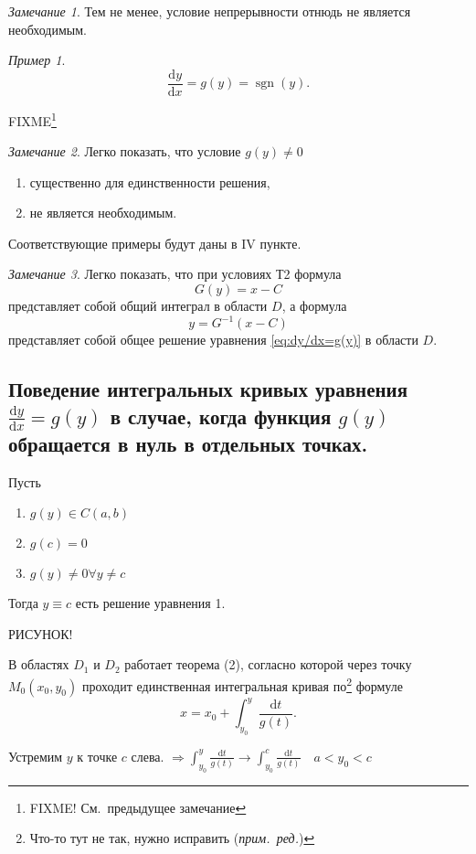 \documentclass[a4paper,10pt]{report}
\newcommand{\ud}{\mathrm{d}}
\newcommand{\ednote}{(\textit{прим.\ ред.})}
\theoremstyle{definition}
\theoremstyle{remark}
\newtheorem{note}{Замечание}[section]
\newtheorem{example}{Пример}[section]
\theoremstyle{plain}
\DeclareMathOperator{\sgn}{sgn}
\begin{document}
\begin{note}
 Тем не менее, условие непрерывности отнюдь не является необходимым.
\end{note}
\begin{example}
 \begin{equation*}
  \frac{\ud y}{\ud x} = g(y) = \sgn(y).
 \end{equation*}

 FIXME\footnote{FIXME! См.\ предыдущее замечание}
\end{example}
\begin{note}
 Легко показать, что условие $g(y) \ne 0$
 \begin{enumerate}
  \renewcommand{\theenumi}{\asbuk{enumi}}
  \item существенно для единственности решения,
  \item не является необходимым.
 \end{enumerate}
 Соответствующие примеры будут даны в IV пункте.
\end{note}
\begin{note}
 Легко показать, что при условиях Т2 формула
 \[
  G(y) = x-C
 \]
 представляет собой общий интеграл в области $D$, а формула
 \[
  y = G^{-1}(x-C)
 \]
 представляет собой общее решение уравнения \eqref{eq:dy/dx=g(y)} в области $D$.
\end{note}

\subsection{Поведение интегральных кривых уравнения $\displaystyle\frac{\ud y}{\ud x} = g(y)$ в случае, когда функция $g(y)$ обращается в нуль в отдельных точках.}
Пусть
\begin{enumerate}
 \item $g(y) \in C(a,b)$
 \item $g(c) = 0$
 \item $g(y) \ne 0 \forall y \ne c$
\end{enumerate}
Тогда $y \equiv c$ есть решение уравнения 1.

РИСУНОК!

В областях $D_1$ и $D_2$ работает теорема (2), согласно которой через точку $M_0(x_0,y_0)$ проходит единственная интегральная кривая по\footnote{Что-то тут не так, нужно исправить \ednote} формуле
\begin{equation}
 x = x_0 + \int_{y_0}^y \frac{\ud t}{g(t)}.
\end{equation}

Устремим $y$ к точке $c$ слева. $\Longrightarrow \int_{y_0}^y \frac{\ud t}{g(t)} \to \int_{y_0}^c \frac{\ud t}{g(t)} \quad a < y_0 < c$
\end{document}
